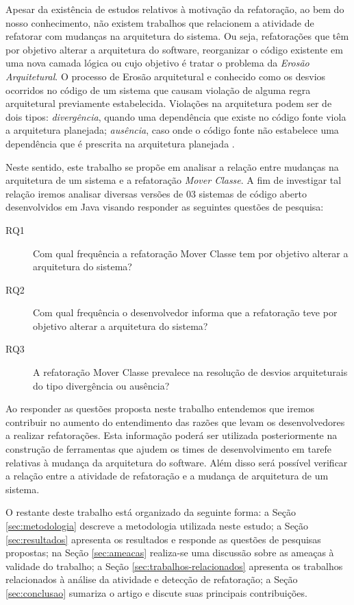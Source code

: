 \documentclass[12pt]{article}
\begin{document}
Apesar da existência de estudos relativos à motivação da refatoração, ao bem do nosso conhecimento, não existem trabalhos que relacionem a atividade de refatorar com mudanças na arquitetura do sistema. Ou seja, refatorações que têm por objetivo alterar a arquitetura do software, reorganizar o código existente em uma nova camada lógica ou cujo objetivo é tratar o problema da  \textit{Erosão Arquitetural}. O processo de Erosão arquitetural e conhecido como os desvios ocorridos no código de um sistema que causam violação de alguma regra arquitetural previamente estabelecida\cite{Perry:1992:FSS:141874.141884}. Violações na arquitetura podem ser de dois tipos: \textit{divergência}, quando uma dependência que existe no código fonte viola a arquitetura planejada; \textit{ausência}, caso onde o código fonte não estabelece uma dependência que é prescrita na arquitetura planejada \cite{5204070}.	

Neste sentido, este trabalho se propõe em analisar a relação entre mudanças na arquitetura de um sistema e a refatoração \textit{Mover Classe}. A fim de investigar tal relação iremos analisar diversas versões de 03 sistemas de código aberto desenvolvidos em Java visando responder as seguintes questões de pesquisa:


\begin{description}
	\item[RQ1] Com qual frequência a refatoração Mover Classe tem por objetivo alterar a arquitetura do sistema?
	\item[RQ2] Com qual frequência o desenvolvedor informa que a refatoração teve por objetivo alterar a arquitetura do sistema?
	\item[RQ3] A refatoração Mover Classe prevalece na resolução de desvios arquiteturais do tipo divergência ou ausência?	
\end{description}

Ao responder as questões proposta neste trabalho entendemos que iremos contribuir no aumento do entendimento das razões que levam os desenvolvedores a realizar refatorações. Esta informação poderá ser utilizada posteriormente na construção de ferramentas que ajudem os times de desenvolvimento em tarefe relativas à mudança da arquitetura do software. Além disso será possível verificar a relação entre a atividade de refatoração e a mudança de arquitetura de um sistema. 


O restante deste trabalho está organizado da seguinte forma: a Seção \ref{sec:metodologia} descreve a metodologia utilizada neste estudo; a Seção \ref{sec:resultados} apresenta os resultados e responde as questões de pesquisas propostas; na Seção \ref{sec:ameacas} realiza-se uma discussão sobre as ameaças à validade do trabalho; a Seção \ref{sec:trabalhos-relacionados} apresenta os trabalhos relacionados à análise da atividade e detecção de refatoração; a Seção \ref{sec:conclusao} sumariza o artigo e discute suas principais contribuições.
\end{document}
